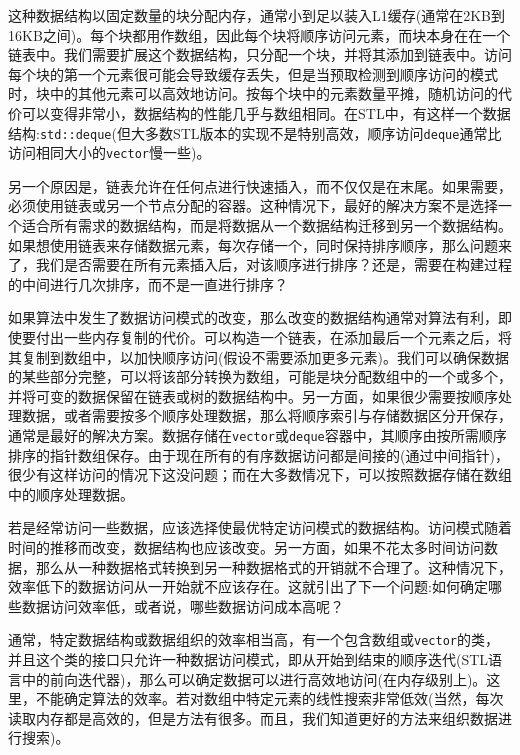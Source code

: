 这种数据结构以固定数量的块分配内存，通常小到足以装入L1缓存(通常在2KB到16KB之间)。每个块都用作数组，因此每个块将顺序访问元素，而块本身在在一个链表中。我们需要扩展这个数据结构，只分配一个块，并将其添加到链表中。访问每个块的第一个元素很可能会导致缓存丢失，但是当预取检测到顺序访问的模式时，块中的其他元素可以高效地访问。按每个块中的元素数量平摊，随机访问的代价可以变得非常小，数据结构的性能几乎与数组相同。在STL中，有这样一个数据结构:\texttt{std::deque}(但大多数STL版本的实现不是特别高效，顺序访问\texttt{deque}通常比访问相同大小的\texttt{vector}慢一些)。

另一个原因是，链表允许在任何点进行快速插入，而不仅仅是在末尾。如果需要，必须使用链表或另一个节点分配的容器。这种情况下，最好的解决方案不是选择一个适合所有需求的数据结构，而是将数据从一个数据结构迁移到另一个数据结构。如果想使用链表来存储数据元素，每次存储一个，同时保持排序顺序，那么问题来了，我们是否需要在所有元素插入后，对该顺序进行排序？还是，需要在构建过程的中间进行几次排序，而不是一直进行排序？

如果算法中发生了数据访问模式的改变，那么改变的数据结构通常对算法有利，即使要付出一些内存复制的代价。可以构造一个链表，在添加最后一个元素之后，将其复制到数组中，以加快顺序访问(假设不需要添加更多元素)。我们可以确保数据的某些部分完整，可以将该部分转换为数组，可能是块分配数组中的一个或多个，并将可变的数据保留在链表或树的数据结构中。另一方面，如果很少需要按顺序处理数据，或者需要按多个顺序处理数据，那么将顺序索引与存储数据区分开保存，通常是最好的解决方案。数据存储在\texttt{vector}或\texttt{deque}容器中，其顺序由按所需顺序排序的指针数组保存。由于现在所有的有序数据访问都是间接的(通过中间指针)，很少有这样访问的情况下这没问题；而在大多数情况下，可以按照数据存储在数组中的顺序处理数据。

若是经常访问一些数据，应该选择使最优特定访问模式的数据结构。访问模式随着时间的推移而改变，数据结构也应该改变。另一方面，如果不花太多时间访问数据，那么从一种数据格式转换到另一种数据格式的开销就不合理了。这种情况下，效率低下的数据访问从一开始就不应该存在。这就引出了下一个问题:如何确定哪些数据访问效率低，或者说，哪些数据访问成本高呢？


通常，特定数据结构或数据组织的效率相当高，有一个包含数组或\texttt{vector}的类，并且这个类的接口只允许一种数据访问模式，即从开始到结束的顺序迭代(STL语言中的前向迭代器)，那么可以确定数据可以进行高效地访问(在内存级别上)。这里，不能确定算法的效率。若对数组中特定元素的线性搜索非常低效(当然，每次读取内存都是高效的，但是方法有很多。而且，我们知道更好的方法来组织数据进行搜索)。

